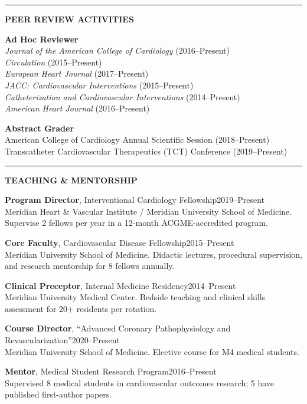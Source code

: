 \documentclass[11pt,a4paper]{article}
\newcommand{\cvsection}[1]{%
  \vspace{1.2em}%
  \noindent
  {\color{primary}\rule{3.5pt}{15pt}}\hspace{8pt}%
  {\color{primary}\Large\bfseries\MakeUppercase{#1}}%
  \vspace{0.2em}%
  \par\noindent{\color{primary!25}\rule{\textwidth}{0.5pt}}%
  \vspace{0.6em}%
}
\begin{document}
\cvsection{Peer Review Activities}

\vspace{-2pt}
{\color{darktext}
\noindent\textbf{\color{primary}Ad Hoc Reviewer}\\
\textit{Journal of the American College of Cardiology} (2016--Present)\\
\textit{Circulation} (2015--Present)\\
\textit{European Heart Journal} (2017--Present)\\
\textit{JACC: Cardiovascular Interventions} (2015--Present)\\
\textit{Catheterization and Cardiovascular Interventions} (2014--Present)\\
\textit{American Heart Journal} (2016--Present)

\vspace{4pt}
\noindent\textbf{\color{primary}Abstract Grader}\\
American College of Cardiology Annual Scientific Session (2018--Present)\\
Transcatheter Cardiovascular Therapeutics (TCT) Conference (2019--Present)
}

\cvsection{Teaching \& Mentorship}

\vspace{-2pt}
{\color{darktext}
\noindent\textbf{\color{primary}Program Director}, Interventional Cardiology Fellowship\hfill 2019--Present\\
Meridian Heart \& Vascular Institute / Meridian University School of Medicine. Supervise 2 fellows per year in a 12-month ACGME-accredited program.

\vspace{4pt}
\noindent\textbf{\color{primary}Core Faculty}, Cardiovascular Disease Fellowship\hfill 2015--Present\\
Meridian University School of Medicine. Didactic lectures, procedural supervision, and research mentorship for 8 fellows annually.

\vspace{4pt}
\noindent\textbf{\color{primary}Clinical Preceptor}, Internal Medicine Residency\hfill 2014--Present\\
Meridian University Medical Center. Bedside teaching and clinical skills assessment for 20+ residents per rotation.

\vspace{4pt}
\noindent\textbf{\color{primary}Course Director}, ``Advanced Coronary Pathophysiology and Revascularization''\hfill 2020--Present\\
Meridian University School of Medicine. Elective course for M4 medical students.

\vspace{4pt}
\noindent\textbf{\color{primary}Mentor}, Medical Student Research Program\hfill 2016--Present\\
Supervised 8 medical students in cardiovascular outcomes research; 5 have published first-author papers.
}
\end{document}
